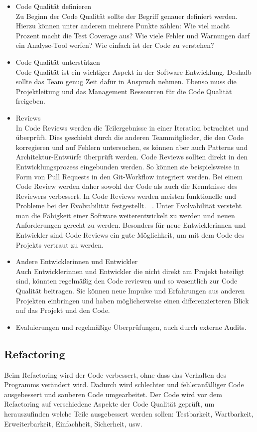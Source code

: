 \begin{itemize} 
\item Code Qualität definieren \\
Zu Beginn der Code Qualität sollte der Begriff genauer definiert werden. Hierzu können unter anderem mehrere Punkte zählen: Wie viel macht Prozent macht die Test Coverage aus? Wie viele Fehler und Warnungen darf ein Analyse-Tool werfen? Wie einfach ist der Code zu verstehen? 
\item Code Qualität unterstützen \\
Code Qualität ist ein wichtiger Aspekt in der Software Entwicklung. Deshalb sollte das Team genug Zeit dafür in Anspruch nehmen. Ebenso muss die Projektleitung und das Management Ressourcen für die Code Qualität freigeben.
\item Reviews \\
In Code Reviews werden die Teilergebnisse in einer Iteration betrachtet und überprüft. Dies geschieht durch die anderen Teammitglieder, die den Code korregieren und auf Fehlern untersuchen, es können aber auch Patterns und Architektur-Entwürfe überprüft werden. Code Reviews sollten direkt in den Entwicklungsprozess eingebunden werden. So können sie beispielsweise in Form von Pull Requests in den Git-Workflow integriert werden. Bei einem Code Review werden daher sowohl der Code als auch die Kenntnisse des Reviewers verbessert. 
In Code Reviews werden meisten funktionelle und Probleme bei der Evolvabilität festgestellt. ~\parencite{mantyla2008types}. Unter Evolvabilität versteht man die Fähigkeit einer Software weiterentwickelt zu werden und neuen Anforderungen gerecht zu werden. Besonders für neue Entwicklerinnen und Entwickler sind Code Reviews ein gute Möglichkeit, um mit dem Code des Projekts vertraut zu werden.
\item Andere Entwicklerinnen und Entwickler \\
Auch Entwicklerinnen und Entwickler die nicht direkt am Projekt beteiligt sind, könnten regelmäßig den Code reviewen und so wesentlich zur Code Qualität beitragen. Sie können neue Impulse und Erfahrungen aus anderen Projekten einbringen und haben möglicherweise einen differenzierteren Blick auf das Projekt und den Code. 
\item Evaluierungen und regelmäßige Überprüfungen, auch durch externe Audits. 
\end{itemize}
\subsection{Refactoring}
Beim Refactoring wird der Code verbessert, ohne dass das Verhalten des Programms verändert wird. Dadurch wird schlechter und fehleranfälliger Code ausgebessert und sauberen Code umgearbeitet. Der Code wird vor dem Refactoring auf verschiedene Aspekte der Code Qualität geprüft, um herauszufinden welche Teile ausgebessert werden sollen: Testbarkeit, Wartbarkeit, Erweiterbarkeit, Einfachheit, Sicherheit, usw.  ~\parencite{fowler2018refactoring} 
